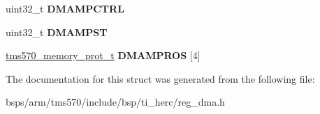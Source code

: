 \begin{DoxyCompactItemize}
\mbox{\label{structtms570__dma__t_a497bb52ee07cf7905a798debfa6d0c93}} 
uint32\+\_\+t {\bfseries D\+M\+A\+M\+P\+C\+T\+RL}
\item 
\mbox{\label{structtms570__dma__t_ae0df2c386208d7c6d28fd2de18010dfd}} 
uint32\+\_\+t {\bfseries D\+M\+A\+M\+P\+ST}
\item 
\mbox{\label{structtms570__dma__t_abf6da0c23ca580b092acc4439ee022b1}} 
\mbox{\hyperlink{structtms570__memory__prot__t}{tms570\+\_\+memory\+\_\+prot\+\_\+t}} {\bfseries D\+M\+A\+M\+P\+R\+OS} \mbox{[}4\mbox{]}
\end{DoxyCompactItemize}


The documentation for this struct was generated from the following file\+:\begin{DoxyCompactItemize}
\item 
bsps/arm/tms570/include/bsp/ti\+\_\+herc/reg\+\_\+dma.\+h\end{DoxyCompactItemize}
